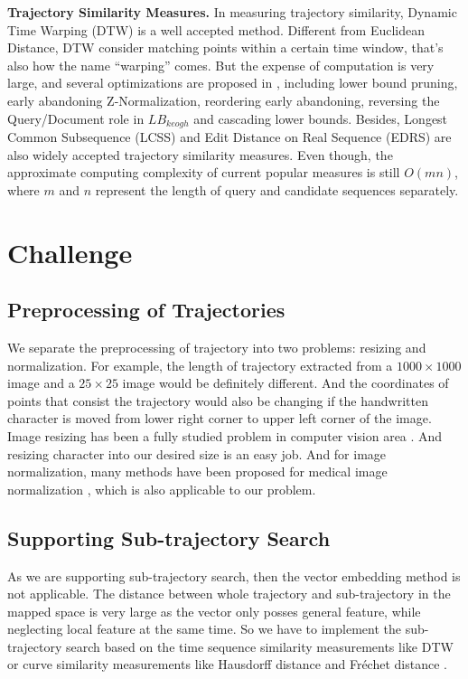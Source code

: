 \documentclass[sigconf]{acmart}
\begin{document}
\noindent
\textbf{Trajectory Similarity Measures.} In measuring trajectory similarity, Dynamic Time Warping (DTW) is a well accepted method. Different from Euclidean Distance, DTW consider matching points within a certain time window, that's also how the name ``warping'' comes. But the expense of computation is very large, and several optimizations are proposed in \cite{RakthanmanonDTW, vldb/LB_keogh, KeoghWXVLP09}, including lower bound pruning, early abandoning Z-Normalization, reordering early abandoning, reversing the Query/Document role in $LB_{keogh}$ and cascading lower bounds. Besides, Longest Common Subsequence (LCSS) and Edit Distance on Real Sequence (EDRS) are also widely accepted trajectory similarity measures. Even though, the approximate computing complexity of current popular measures is still $O(mn)$, where $m$ and $n$ represent the length of query and candidate sequences separately. 

\section{Challenge}
\subsection{Preprocessing of Trajectories}
We separate the preprocessing of trajectory into two problems: resizing and normalization. For example, the length of trajectory extracted from a $1000 \times 1000$ image and a $25 \times 25$ image would be definitely different. And the coordinates of points that consist the trajectory would also be changing if the handwritten character is moved from lower right corner to upper left corner of the image. Image resizing has been a fully studied problem in computer vision area \cite{CVPR/imageresize}. And resizing character into our desired size is an easy job. And for image normalization, many methods have been proposed for medical image normalization \cite{isbi/OnofreyCLSVFSSS19}, which is also applicable to our problem. 
\subsection{Supporting Sub-trajectory  Search}
As we are supporting sub-trajectory search, then the vector embedding method is not applicable. The distance between whole trajectory and sub-trajectory in the mapped space is very large as the vector only posses general feature, while neglecting local feature at the same time. So we have to implement the sub-trajectory search based on the time sequence similarity measurements like DTW or curve similarity measurements like Hausdorff distance and Fréchet distance \cite{siam/AgarwalAKS14,pvldb/NutanongJS11}.
\end{document}
